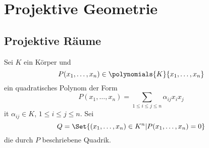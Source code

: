 \chapter{Projektive Geometrie}
\section{Projektive  Räume}
Sei \( K \) ein Körper und 
\begin{equation*}
  P(x_1,\dotsc, x_n)\in \polynomials{K}{x_1,\dotsc,x_n}
\end{equation*}
ein quadratisches Polynom der Form 
\begin{equation*}
  P(x_1,\dotsc,x_n)=\sum_{1\leq i\leq j \leq n}\alpha_{ij}x_i x_j
\end{equation*}
it \( \alpha_{ij}\in K \), \( 1\leq i \leq j\leq n \). Sei
\begin{equation*}
  Q=\Set{(x_1,\dotsc,x_n)\in K^n|P(x_1,\dotsc,x_n)=0}
\end{equation*}
die durch \( P \) beschriebene Quadrik.

